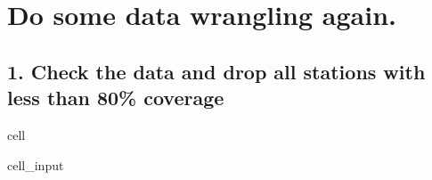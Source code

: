 \documentclass[letterpaper,10pt,english]{jupyterBook}
\begin{document}
\section{Do some data wrangling again.}
\label{\detokenize{notebooks/regional_and_local/SL_anomaly_annual:do-some-data-wrangling-again}}

\subsection{1. Check the data and drop all stations with less than 80\% coverage}
\label{\detokenize{notebooks/regional_and_local/SL_anomaly_annual:check-the-data-and-drop-all-stations-with-less-than-80-coverage}}
\begin{sphinxuseclass}{cell}\begin{sphinxVerbatimInput}

\begin{sphinxuseclass}{cell_input}
\begin{sphinxVerbatim}[commandchars=\\\{\}]
  

  

\end{sphinxVerbatim}

\end{sphinxuseclass}\end{sphinxVerbatimInput}
\begin{sphinxVerbatimOutput}


\end{sphinxVerbatimOutput}
\end{sphinxuseclass}
\end{document}
